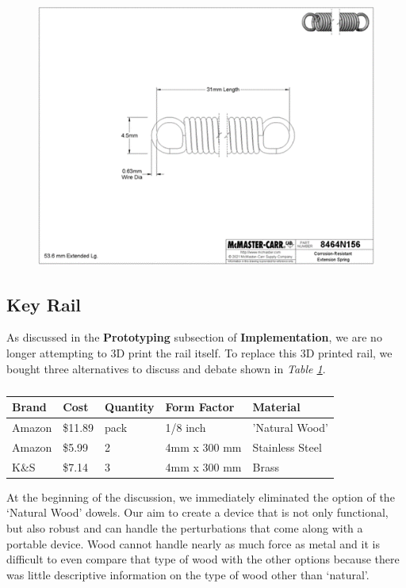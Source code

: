 \newpage
\begin{figure}[h!]
  \centering
  \includegraphics[width=\linewidth]{image/Spring3.png}
  \caption{}
  \label{fig:spring3}
\end{figure}
\newpage

\subsection{Key Rail}

As discussed in the \textbf{Prototyping} subsection of \textbf{Implementation}, we are no longer attempting to 3D print the rail itself. To replace this 3D printed rail, we bought three alternatives to discuss and debate shown in \textit{Table \ref{Tab:rail_brand}}.

\begin{table}[]
  \centering
  \begin{tabular}{|l|l|l|l|l|}
    \hline
    Brand  & Cost    & Quantity & Form Factor  & Material        \\ \hline
    Amazon & \$11.89 & pack     & 1/8 inch     & 'Natural Wood'  \\ \hline
    Amazon & \$5.99  & 2        & 4mm x 300 mm & Stainless Steel \\ \hline
    K\&S   & \$7.14  & 3        & 4mm x 300 mm & Brass           \\ \hline
  \end{tabular}
  \caption{}
  \label{Tab:rail_brand}
\end{table}

At the beginning of the discussion, we immediately eliminated the option of the ‘Natural Wood’ dowels. Our aim to create a device that is not only functional, but also robust and can handle the perturbations that come along with a portable device. Wood cannot handle nearly as much force as metal and it is difficult to even compare that type of wood with the other options because there was little descriptive information on the type of wood other than ‘natural’.

